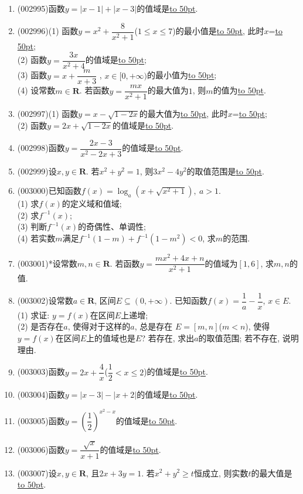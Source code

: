 \documentclass[10pt,a4paper]{article}
\newcommand{\blank}[1]{\underline{\hbox to #1pt{}}}
\begin{document}
\begin{enumerate}[1.]
\item {\tiny (002995)}函数$y=|x-1|+|x-3|$的值域是\blank{50}.
\item {\tiny (002996)}(1) 函数$y=x^2+\dfrac 8{x^2+1}$($1\le x\le 7$)的最小值是\blank{50}, 此时$x$=\blank{50};\\
(2) 函数$y=\dfrac{3x}{x^2+4}$的值域是\blank{50};\\
(3) 函数$y=x+\dfrac m{x+3}$ , $x\in [0,+\infty)$的最小值为\blank{50};\\
(4) 设常数$m\in \mathbf{R}$. 若函数$y=\dfrac{mx}{x^2+1}$的最大值为$1$, 则$m$的值为\blank{50}.
\item {\tiny (002997)}(1) 函数$y=x-\sqrt{1-2x}$的最大值为\blank{50}, 此时$x$=\blank{50};\\
(2) 函数$y=2x+\sqrt{1-2x}$的值域是\blank{50}.
\item {\tiny (002998)}函数$y=\dfrac{2x-3}{x^2-2x+3}$的值域是\blank{50}.
\item {\tiny (002999)}设$x,y\in \mathbf{R}$. 若$x^2+y^2=1$, 则$3x^2-4y^2$的取值范围是\blank{50}.
\item {\tiny (003000)}已知函数$f(x)=\log_a(x+\sqrt{x^2+1}), \ a>1$.\\
(1) 求$f(x)$的定义域和值域;\\
(2) 求$f^{-1}(x)$;\\
(3) 判断$f^{-1}(x)$的奇偶性、单调性;\\
(4) 若实数$m$满足$f^{-1}(1-m)+f^{-1}(1-m^2)<0$, 求$m$的范围.
\item {\tiny (003001)}*设常数$m,n\in \mathbf{R}$. 若函数$y=\dfrac{mx^2+4x+n}{x^2+1}$的值域为$[1,6]$, 求$m,n$的值.
\item {\tiny (003002)}设常数$a\in \mathbf{R}$, 区间$E\subseteq (0,+\infty)$. 已知函数$f(x)=\dfrac 1a-\dfrac 1x$, $x\in E$.\\
(1) 求证: $y=f(x)$在区间$E$上递增;\\
(2) 是否存在$a$, 使得对于这样的$a$, 总是存在 $E=[m,n]$($m<n$), 使得$y=f(x)$在区间$E$上的值域也是$E$? 若存在, 求出$a$的取值范围; 若不存在, 说明理由.
\item {\tiny (003003)}函数$y=2x+\dfrac 4x$($\dfrac 12<x\le 2$)的值域是\blank{50}.
\item {\tiny (003004)}函数$y=|x-3|-|x+2|$的值域是\blank{50}.
\item {\tiny (003005)}函数$y=(\dfrac 12)^{x^2-x}$的值域是\blank{50}.
\item {\tiny (003006)}函数$y=\dfrac{\sqrt x}{x+1}$的值域是\blank{50}.
\item {\tiny (003007)}设$x,y\in \mathbf{R}$, 且$2x+3y=1$. 若$x^2+y^2\ge t$恒成立, 则实数$t$的最大值是\blank{50}.

\end{enumerate}
\end{document}
